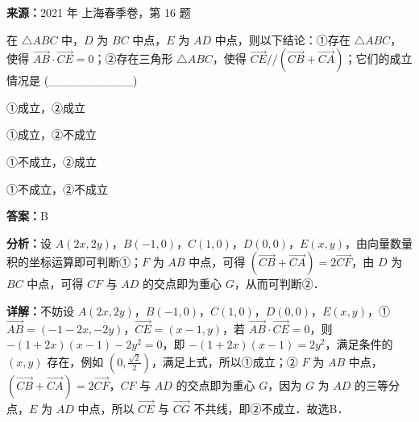 \begin{question}[points=5]
\textbf{来源：}2021 年 上海春季卷，第 16 题\par
在 $\triangle ABC$ 中，$D$ 为 $BC$ 中点，$E$ 为 $AD$ 中点，则以下结论：①存在 $\triangle ABC$，使得 $\overrightarrow{AB}\cdot\overrightarrow{CE}=0$；②存在三角形 $\triangle ABC$，使得 $\overrightarrow{CE}//(\overrightarrow{CB}+\overrightarrow{CA})$；它们的成立情况是 (\_\_\_\_\_\_\_\_\_\_)
\begin{choices}
  \item ①成立，②成立
  \item ①成立，②不成立
  \item ①不成立，②成立
  \item ①不成立，②不成立
\end{choices}
\begin{solution}
\textbf{答案：}B

\textbf{分析：}设 $A(2x,2y)$，$B(-1,0)$，$C(1,0)$，$D(0,0)$，$E(x,y)$，由向量数量积的坐标运算即可判断①；$F$ 为 $AB$ 中点，可得 $(\overrightarrow{CB}+\overrightarrow{CA})=2\overrightarrow{CF}$，由 $D$ 为 $BC$ 中点，可得 $CF$ 与 $AD$ 的交点即为重心 $G$，从而可判断②．

\textbf{详解：}不妨设 $A(2x,2y)$，$B(-1,0)$，$C(1,0)$，$D(0,0)$，$E(x,y)$，① $\overrightarrow{AB}=(-1-2x,-2y)$，$\overrightarrow{CE}=(x-1,y)$，若 $\overrightarrow{AB}\cdot\overrightarrow{CE}=0$，则 $-(1+2x)(x-1)-2y^2=0$，即 $-(1+2x)(x-1)=2y^2$，满足条件的 $(x,y)$ 存在，例如 $(0,\frac{\sqrt{2}}{2})$，满足上式，所以①成立；② $F$ 为 $AB$ 中点，$(\overrightarrow{CB}+\overrightarrow{CA})=2\overrightarrow{CF}$，$CF$ 与 $AD$ 的交点即为重心 $G$，因为 $G$ 为 $AD$ 的三等分点，$E$ 为 $AD$ 中点，所以 $\overrightarrow{CE}$ 与 $\overrightarrow{CG}$ 不共线，即②不成立．故选B．
\end{solution}
\end{question}

